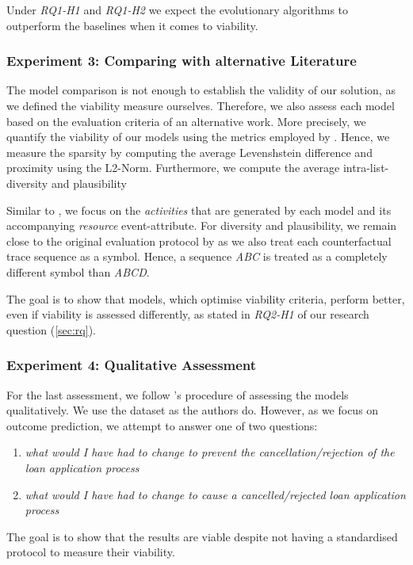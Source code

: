 \documentclass[./../../paper.tex]{subfiles}
\begin{document}
\noindent Under \emph{RQ1-H1} and \emph{RQ1-H2} we expect the evolutionary algorithms to outperform the baselines when it comes to viability.

\subsubsection{Experiment 3: Comparing with alternative Literature}
The model comparison is not enough to establish the validity of our solution, as we defined the viability measure ourselves. Therefore, we also assess each model based on the evaluation criteria of an alternative work. More precisely, we quantify the viability of our models using the metrics employed by \citeauthor{hsieh_DiCE4ELInterpretingProcess_2021}. Hence, we measure the sparsity by computing the average Levenshstein difference and proximity using the L2-Norm. Furthermore, we compute the average intra-list-diversity and plausibility %

Similar to \citeauthor{hsieh_DiCE4ELInterpretingProcess_2021}, we focus on the \emph{activities} that are generated by each model and its accompanying \emph{resource} event-attribute. For diversity and plausibility, we remain close to the original evaluation protocol by \citeauthor{hsieh_DiCE4ELInterpretingProcess_2021} as we also treat each counterfactual trace sequence as a symbol. Hence, a sequence \emph{ABC} is treated as a completely different symbol than \emph{ABCD}.

The goal is to show that models, which optimise viability criteria, perform better, even if viability is assessed differently, as stated in \emph{RQ2-H1} of our research question (\autoref{sec:rq}). 

\subsubsection{Experiment 4: Qualitative Assessment}
For the last assessment, we follow \citeauthor{hsieh_DiCE4ELInterpretingProcess_2021}'s procedure of assessing the models qualitatively. We use the dataset as the authors do. However, as we focus on outcome prediction, we attempt to answer one of two questions: 

\begin{enumerate}
    \item \emph{what would I have had to change to prevent the cancellation/rejection of the loan application process}
    \item \emph{what would I have had to change to cause a cancelled/rejected loan application process}
\end{enumerate}

The goal is to show that the results are viable despite not having a standardised protocol to measure their viability.
\end{document}
